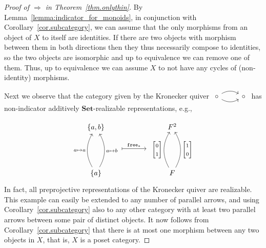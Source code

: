 \documentclass[a4paper]{amsart}
\theoremstyle{plain}
\theoremstyle{definition}
\theoremstyle{remark}
\newcommand{\funct}[1]{\operatorname{\mathtt{#1}}}
\newcommand{\Set}{\mathbf{Set}}
\begin{document}
\begin{proof}[Proof of \( \Rightarrow \) in Theorem~\ref{thm.onlythin}]
By Lemma~\ref{lemma:indicator_for_monoids}, in conjunction with Corollary~\ref{cor.subcategory},  we can assume that the only morphisms from an object of \( X \) to itself are identities. If there are two objects with morphism between them in both directions then they thus necessarily compose to identities, so the two objects are isomorphic and up to equivalence we can remove one of them. Thus, up to equivalence we can assume \( X \) to not have any cycles of (non-identity) morphisms.

Next we observe that the category given by the Kronecker quiver $\begin{tikzcd} \circ\ar[r, bend left]\ar[r, bend right] & \circ \end{tikzcd}$ has non-indicator additively \( \Set \)-realizable representations, e.g.,

\[
\begin{tikzcd}[sep=7mm,ampersand replacement=\&]
  \{a,b\} \& \& \& \& F^2 \\
 ~\ar[rrrr,mapsto, shorten <= 30pt, shorten >= 30pt, "\funct{free}_*"] \& \&  \& \& ~\\
  \{a\} \arrow[uu,swap, bend right, "a\mapsto b"]\arrow[uu,"a\mapsto a", bend left]  \& \& \&  \& F\arrow[uu, "{\begin{bmatrix}0 \\ 1\end{bmatrix}}", bend left] \arrow[uu, swap, "{\begin{bmatrix}1 \\ 0\end{bmatrix}}", bend right]
\end{tikzcd}
\]
In fact, all preprojective representations of the Kronecker quiver are realizable.
This example can easily be extended to any number of parallel arrows, and using Corollary~\ref{cor.subcategory} also to any other category with at least two parallel arrows between some pair of distinct objects.
It now follows from Corollary~\ref{cor.subcategory} that there is at most one morphism between any two objects in \( X \), that is, \( X \) is a poset category.


\end{proof}
\end{document}
